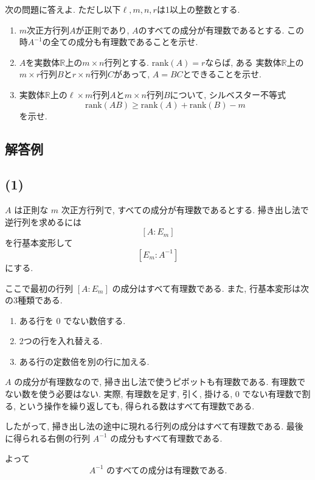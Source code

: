 \documentclass[uplatex,dvipdfmx,a4paper,14pt]{jsarticle}
\newcommand{\R}{\mathbb{R}}
\begin{document}
\begin{tcolorbox}[problemstyle,title=問題]

次の問題に答えよ. ただし以下$\ell, m, n, r$は1以上の整数とする.
 \begin{enumerate}[label=(\arabic*)]
 \setlength{\parskip}{0cm}
  \setlength{\itemsep}{0cm}
  \item $m$次正方行列$A$が正則であり, $A$のすべての成分が有理数であるとする. この時$A^{-1}$の全ての成分も有理数であることを示せ.
 \item $A$を実数体$\R$上の$m \times n$行列とする.
 $\mathrm{rank}(A)=r$ならば, ある
 実数体$\R$上の$m\times r$行列$B$と$r \times n$行列$C$があって, $A=BC$とできることを示せ.
    \item 実数体$\R$上の$\ell \times m$行列$A$と$m \times n$行列$B$について, シルベスター不等式
    $$\mathrm{rank}(AB) \ge \mathrm{rank}(A) + \mathrm{rank}(B) - m$$
    を示せ.
 \end{enumerate}

\end{tcolorbox}

\subsection*{解答例}

\subsection*{(1)}
$A$ は正則な $m$ 次正方行列で, すべての成分が有理数であるとする. 掃き出し法で逆行列を求めるには
\[
[A:E_m]
\]
を行基本変形して
\[
[E_m:A^{-1}]
\]
にする.

ここで最初の行列 $[A:E_m]$ の成分はすべて有理数である. また, 行基本変形は次の3種類である.
\begin{enumerate}
\item ある行を $0$ でない数倍する.
\item 2つの行を入れ替える.
\item ある行の定数倍を別の行に加える.
\end{enumerate}
$A$ の成分が有理数なので, 掃き出し法で使うピボットも有理数である. 有理数でない数を使う必要はない. 実際, 有理数を足す, 引く, 掛ける, $0$ でない有理数で割る, という操作を繰り返しても, 得られる数はすべて有理数である.

したがって, 掃き出し法の途中に現れる行列の成分はすべて有理数である. 最後に得られる右側の行列 $A^{-1}$ の成分もすべて有理数である.

よって
\[
\boxed{A^{-1}\text{ のすべての成分は有理数である}.}
\]
\end{document}
